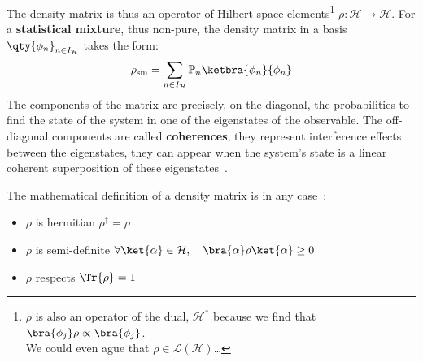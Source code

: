 The density matrix is thus an operator of Hilbert space elements\footnote{$\rho$ is also an operator of the dual, $\mathcal{H}^*$ because we find that $\bra{\phi_j}\rho\propto\bra{\phi_j}$.\\We could even ague that $\rho\in\mathcal{L(H)}$\ldots} $\rho:\mathcal{H}\rightarrow\mathcal{H}$. For a \textbf{statistical mixture}, thus non-pure, the density matrix in a basis $\qty{\phi_n}_{n\in I_\mathcal{H}}$ takes the form:
\begin{equation}
    \rho_\text{sm} = \sum_{n\in I_\mathcal{H}} \mathbb{P}_n \ketbra{\phi_n}{\phi_n} 
\end{equation}
The components of the matrix are precisely, on the diagonal, the probabilities to find the state of the system in one of the eigenstates of the observable. The off-diagonal components are called \textbf{coherences}, they represent interference effects between the eigenstates, they can appear when the system's state is a linear coherent superposition of these eigenstates~\cite{CT}.\par
The mathematical definition of a density matrix is in any case~\cite{CT,Breuer}:
\begin{itemize}
    \item $\rho$ is hermitian $\rho^\dagger=\rho$
    \item $\rho$ is semi-definite $\forall\ket{\alpha}\in\mathcal{H},\quad\bra{\alpha}\rho\ket{\alpha}\geq  0$
    \item $\rho$ respects $\Tr{\rho}=1$
\end{itemize}

